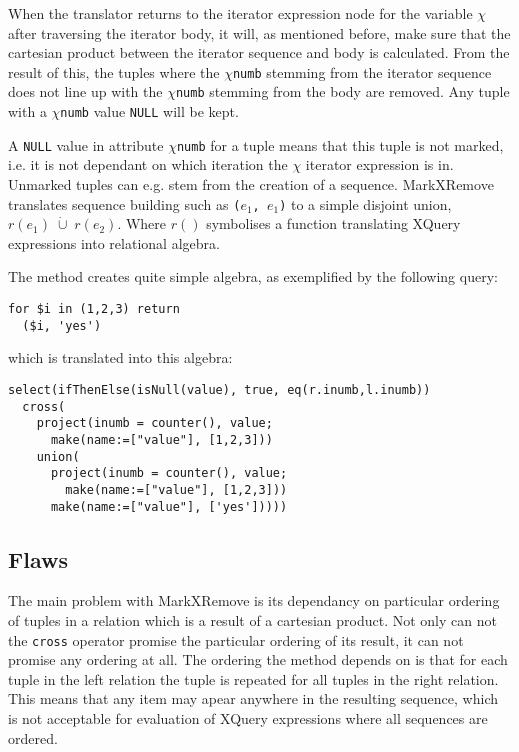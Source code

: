 When the translator returns to the iterator expression node for the variable $\chi$ after traversing the iterator
body, it will, as mentioned before, make sure that the cartesian product between the iterator sequence and body is
calculated. From the result of this, the tuples where the $\chi$\texttt{numb} stemming from the iterator
sequence does not line up with the $\chi$\texttt{numb} stemming from the body are removed. Any tuple with a
$\chi$\texttt{numb} value \texttt{NULL} will be kept.

A \texttt{NULL} value in attribute $\chi$\texttt{numb} for a tuple means that this tuple is not marked, i.e. it is
not dependant on which iteration the $\chi$ iterator expression is in. Unmarked tuples can e.g. stem
from the creation of a sequence. MarkXRemove translates sequence building such as \texttt{(}$e_{1}$\texttt{,
}$e_{1}$\texttt{)} to a simple disjoint union, $r(e_{1})\;\dot\cup\;r(e_{2})$. Where $r()$ symbolises a function
translating XQuery expressions into relational algebra.

The method creates quite simple algebra, as exemplified by the following query:
\begin{Verbatim}
for $i in (1,2,3) return 
  ($i, 'yes')
\end{Verbatim}

which is translated into this algebra:

\begin{Verbatim}
select(ifThenElse(isNull(value), true, eq(r.inumb,l.inumb))
  cross(
    project(inumb = counter(), value;
      make(name:=["value"], [1,2,3]))
    union(
      project(inumb = counter(), value;
        make(name:=["value"], [1,2,3]))
      make(name:=["value"], ['yes']))))
\end{Verbatim} 

\subsection{Flaws}
\label{sect:trans:mxr:flaws}
The main problem with MarkXRemove is its dependancy on particular ordering of tuples in a relation which is a
result of a cartesian product. Not only can not the \texttt{cross} operator promise the particular ordering of its
result, it can not promise any ordering at all. The ordering the method depends on is that for each tuple in the
left relation the tuple is repeated for all tuples in the right relation. This means that any item may apear
anywhere in the resulting sequence, which is not acceptable for evaluation of XQuery expressions where all
sequences are ordered.

